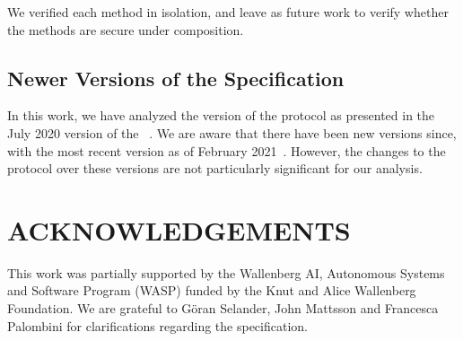 \documentclass[a4paper,twoside]{article}
\begin{document}
We verified each method in isolation, and leave as future work to verify whether
the methods are secure under composition.

\subsection{Newer Versions of the Specification} \label{sec:newdrafts}
In this work, we have analyzed the version of the \mEdhoc{} protocol as
presented in the July 2020 version of the
\mSpec{}~\cite{our-analysis-selander-lake-edhoc-00}.
%
We are aware that there have been new versions since,
with the most recent version as
of February 2021~\cite{latest-ietf-lake-edhoc-05}.
%
However, the changes to the protocol over these versions are not
particularly significant for our analysis.
%

\section*{ACKNOWLEDGEMENTS}
This work was partially supported by
the Wallenberg AI, Autonomous Systems and Software Program (WASP) funded by
the Knut and Alice Wallenberg Foundation.
%
We are grateful to G\"oran Selander, John Mattsson and Francesca Palombini for
clarifications regarding the specification.
%


{\small
    
}
\end{document}
